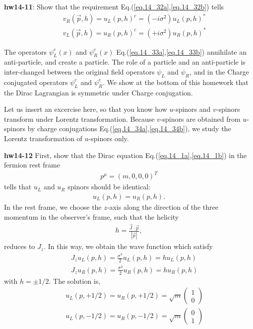 \documentclass[12pt]{article}
\begin{document}
{\bf hw14-11}: Show that the requirement Eq.(\ref{eq.14_32a},\ref{eq.14_32b}) tells
\begin{eqnarray}
  && v_R({\vec p},h) = u_L(p,h)^c = (-i\sigma^2) u_L(p,h)^* \label{eq.14_34a} \\
  && v_L({\vec p},h) = u_R(p,h)^c = (+i\sigma^2) u_R(p,h)^* \label{eq.14_34b}
\end{eqnarray}

  The operators $\psi_L^c(x)$ and $\psi_R^c(x)$ Eq.(\ref{eq.14_33a},\ref{eq.14_33b}) annihilate an
  anti-particle, and create a particle. The role of a particle and
  an anti-particle is inter-changed between the original field operators
  $\psi_L$ and $\psi_R$, and in the Charge conjugated operators
  $\psi_L^c$ and $\psi_R^c$. We show at the bottom of this homework
  that the Dirac Lagrangian is symmetric under Charge conjugation.

  Let us insert an excercise here, so that you know how $u$-spinors and
  $v$-spinors transform under Lorentz transformation. Because $v$-spinors
  are obtained from $u$-spinors by charge conjugations Eq.(\ref{eq.14_34a},\ref{eq.14_34b}), we study
  the Lorentz transformation of $u$-spinors only.

 {\bf hw14-12} First, show that the Dirac equation Eq.(\ref{eq.14_1a},\ref{eq.14_1b}) in the fermion rest frame 
\begin{eqnarray}
  p^\mu = (m,0,0,0)^T \label{eq.14_35}
\end{eqnarray}
   tells that $u_L$ and $u_R$ spinors should be identical:
\begin{eqnarray}
  u_L(p,h) = u_R(p,h). \label{eq.14_36}
\end{eqnarray}
  In the rest frame, we choose the $z$-axis along the direction of the
  three momentum in the observer's frame, such that the helicity
  \begin{eqnarray}
    h = \frac {\vec{J} \cdot \vec{p}}{|\vec{p}|}, \label{eq.14_37}
  \end{eqnarray}
  reduces to $J_z$. In this way, we obtain the wave function which satisfy
\begin{eqnarray}
  &&J_z u_L(p,h) = \frac{\sigma^3}{2} u_L(p,h) = h u_L(p,h) \label{eq.14_38a} \\
  && J_z u_R(p,h) = \frac{\sigma^3}{2} u_R(p,h) = h u_R(p,h) \label{eq.14_38b}
\end{eqnarray}
   with $h=\pm 1/2$.  The solution is,
\begin{eqnarray}
 && u_L(p,+1/2) = u_R(p,+1/2) =\sqrt{m}
  \begin{pmatrix}
    1\\0
  \end{pmatrix} \label{eq.14_39a}\\
  && u_L(p,-1/2) = u_R(p,-1/2) =\sqrt{m}
  \begin{pmatrix}
    0\\ 1
  \end{pmatrix} \label{eq.14_39b}
\end{eqnarray}
\end{document}
